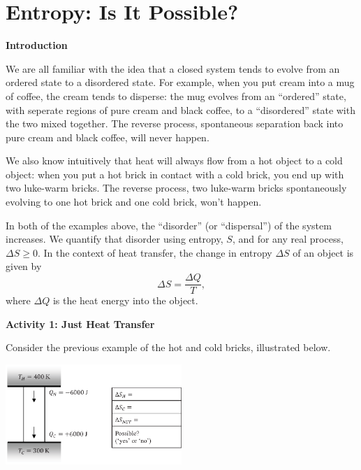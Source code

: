 \section{Entropy: Is It Possible?}

\makelabheader %

\vspace{0.2in}
\textbf{Introduction} 

We are all familiar with the idea that a closed system tends to evolve from an ordered state to a disordered state.  For example, when you put cream into a mug of coffee, the cream tends to disperse: the mug evolves from an ``ordered'' state, with seperate regions of pure cream and black coffee, to a ``disordered'' state with the two mixed together.  The reverse process, spontaneous separation back into pure cream and black coffee, will never happen.

We also know intuitively that heat will always flow from a hot object to a cold object: when you put a hot brick in contact with a cold brick, you end up with two luke-warm bricks.  The reverse process, two luke-warm bricks spontaneously evolving to one hot brick and one cold brick, won't happen.  

In both of the examples above, the ``disorder'' (or ``dispersal'') of the system increases.  We quantify that disorder using entropy, $S$, and for any real process, $\Delta S \geq 0$.  In the context of heat transfer, the change in entropy $\Delta S$ of an object is given by 
\begin{displaymath}
\Delta S = \frac{\Delta Q}{T},
\end{displaymath}
where $\Delta Q$ is the heat energy into the object.  

\vspace{0.3 in}
\textbf{Activity 1: Just Heat Transfer}

Consider the previous example of the hot and cold bricks, illustrated below.

\begin{center}
\vspace{-0.2 in}
\includegraphics[width=0.5\textwidth]{entropy_is_it_possible/fig1.eps}
\vspace{-0.2 in}
\end{center}

